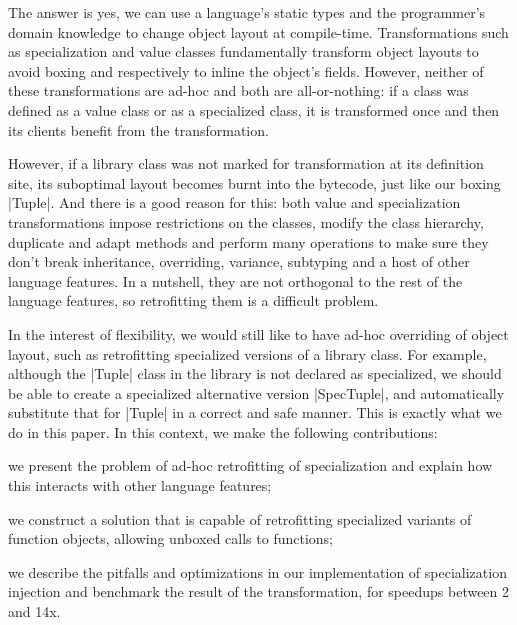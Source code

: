The answer is yes, we can use a language's static types and the programmer's domain knowledge to change object layout at compile-time. Transformations such as specialization and value classes fundamentally transform object layouts to avoid boxing and respectively to inline the object's fields. However, neither of these transformations are ad-hoc and both are all-or-nothing: if a class was defined as a value class or as a specialized class, it is transformed once and then its clients benefit from the transformation.

However, if a library class was not marked for transformation at its definition site, its suboptimal layout becomes burnt into the bytecode, just like our boxing |Tuple|. And there is a good reason for this: both value and specialization transformations impose restrictions on the classes, modify the class hierarchy, duplicate and adapt methods and perform many operations to make sure they don't break inheritance, overriding, variance, subtyping and a host of other language features. In a nutshell, they are not orthogonal to the rest of the language features, so retrofitting them is a difficult problem.

In the interest of flexibility, we would still like to have ad-hoc overriding of object layout, such as retrofitting specialized versions of a library class. For example, although the |Tuple| class in the library is not declared as specialized, we should be able to create a specialized alternative version |SpecTuple|, and automatically substitute that for |Tuple| in a correct and safe manner. This is exactly what we do in this paper. In this context, we make the following contributions:

\begin{itermize}
\item we present the problem of ad-hoc retrofitting of specialization and explain how this interacts with other language features;
\item we construct a solution that is capable of retrofitting specialized variants of function objects, allowing unboxed calls to functions;
\item we describe the pitfalls and optimizations in our implementation of specialization injection and benchmark the result of the transformation, for speedups between 2 and 14x.
\end{itermize}

